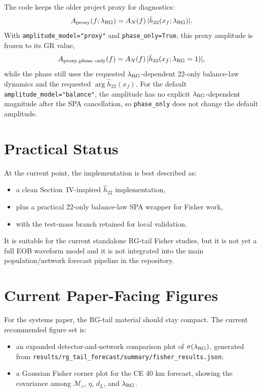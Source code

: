 \documentclass[11pt]{article}
\begin{document}
The code keeps the older project proxy for diagnostics:
\begin{equation}
  A_{\rm proxy}(f;\lambda_{\rm RG})
  =
  A_N(f)\,|\hat h_{22}(x_f;\lambda_{\rm RG})|.
\end{equation}
With \texttt{amplitude\_model="proxy"} and \texttt{phase\_only=True}, this
proxy amplitude is frozen to its GR value,
\begin{equation}
  A_{\rm proxy,phase\ only}(f)
  =
  A_N(f)\,|\hat h_{22}(x_f;\lambda_{\rm RG}=1)|,
\end{equation}
while the phase still uses the requested \(\lambda_{\rm RG}\)-dependent
22-only balance-law dynamics and the requested \(\arg \hat h_{22}(x_f)\).
For the default \texttt{amplitude\_model="balance"}, the amplitude has no
explicit \(\lambda_{\rm RG}\)-dependent magnitude after the SPA cancellation,
so \texttt{phase\_only} does not change the default amplitude.

\section{Practical Status}

At the current point, the implementation is best described as:
\begin{itemize}
  \item a clean Section~IV-inspired \(\hat h_{22}\) implementation,
  \item plus a practical 22-only balance-law SPA wrapper for Fisher work,
  \item with the test-mass branch retained for local validation.
\end{itemize}

It is suitable for the current standalone RG-tail Fisher studies, but it is
not yet a full EOB waveform model and it is not integrated into the main
population/network forecast pipeline in the repository.

\section{Current Paper-Facing Figures}

For the systems paper, the RG-tail material should stay compact. The current
recommended figure set is:
\begin{itemize}
  \item an expanded detector-and-network comparison plot of
  \(\sigma(\lambda_{\rm RG})\), generated from
  \texttt{results/rg\_tail\_forecast/summary/fisher\_results.json};
  \item a Gaussian Fisher corner plot for the CE 40 km forecast, showing the
  covariance among \(\mathcal M_c\), \(\eta\), \(d_L\), and
  \(\lambda_{\rm RG}\).
\end{itemize}
\end{document}
